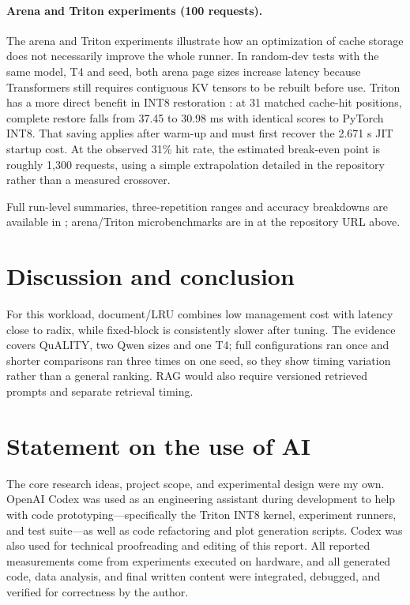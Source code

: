 \documentclass{article}
\begin{document}
\paragraph*{Arena and Triton experiments (100 requests).}
The arena and Triton experiments illustrate how an optimization of cache
storage does not necessarily improve the whole runner. In random-dev tests
with the same model, T4 and seed, both arena page sizes increase latency
because Transformers still requires contiguous KV tensors to be rebuilt
before use. Triton has a more direct benefit in INT8 restoration
\cite{tillet2019triton}: at 31 matched cache-hit positions, complete restore
falls from 37.45 to 30.98 ms with identical scores to PyTorch INT8.
That saving applies after warm-up and must first recover the 2.671 s JIT
startup cost. At the observed 31\% hit rate, the estimated break-even point
is roughly 1,300 requests, using a simple extrapolation detailed in the
repository rather than a measured crossover.

Full run-level summaries, three-repetition ranges and accuracy breakdowns are
available in ; arena/Triton microbenchmarks are in
 at the repository URL above.

\section{Discussion and conclusion}

For this workload, document/LRU combines low management cost with latency
close to radix, while fixed-block is consistently slower after tuning. The
evidence covers QuALITY, two Qwen sizes and one T4; full configurations ran
once and shorter comparisons ran three times on one seed, so they show timing
variation rather than a general ranking. RAG would also require versioned
retrieved prompts and separate retrieval timing.

\clearpage

\section{Statement on the use of AI}

The core research ideas, project scope, and experimental design were my own.
OpenAI Codex was used as an engineering assistant during development to help
with code prototyping—specifically the Triton INT8 kernel, experiment runners,
and test suite—as well as code refactoring and plot generation scripts. Codex was
also used for technical proofreading and editing of this report. All reported
measurements come from experiments executed on hardware, and all generated
code, data analysis, and final written content were integrated, debugged, and
verified for correctness by the author.



\end{document}
